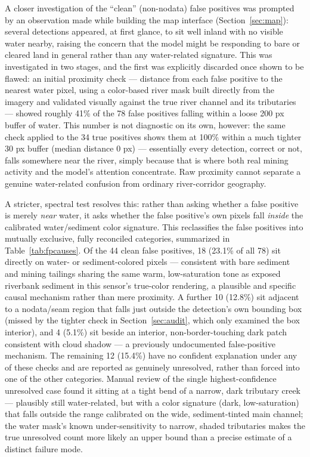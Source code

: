 \documentclass[11pt,a4paper]{article}
\begin{document}
A closer investigation of the ``clean'' (non-nodata) false positives was
prompted by an observation made while building the map interface
(Section~\ref{sec:map}): several detections appeared, at first glance, to
sit well inland with no visible water nearby, raising the concern that the
model might be responding to bare or cleared land in general rather than
any water-related signature. This was investigated in two stages, and the
first was explicitly discarded once shown to be flawed: an initial proximity
check --- distance from each false positive to the nearest water pixel,
using a color-based river mask built directly from the imagery and
validated visually against the true river channel and its tributaries ---
showed roughly 41\% of the 78 false positives falling within a loose 200 px
buffer of water. This number is not diagnostic on its own, however: the
same check applied to the 34 true positives shows them at 100\% within a
much tighter 30 px buffer (median distance 0 px) --- essentially every
detection, correct or not, falls somewhere near the river, simply because
that is where both real mining activity and the model's attention
concentrate. Raw proximity cannot separate a genuine water-related
confusion from ordinary river-corridor geography.

A stricter, spectral test resolves this: rather than asking whether a false
positive is merely \emph{near} water, it asks whether the false positive's
own pixels fall \emph{inside} the calibrated water/sediment color
signature. This reclassifies the false positives into mutually exclusive,
fully reconciled categories, summarized in
Table~\ref{tab:fpcauses}. Of the 44 clean false positives, 18 (23.1\% of
all 78) sit directly on water- or sediment-colored pixels --- consistent
with bare sediment and mining tailings sharing the same warm, low-saturation
tone as exposed riverbank sediment in this sensor's true-color rendering,
a plausible and specific causal mechanism rather than mere proximity. A
further 10 (12.8\%) sit adjacent to a nodata/seam region that falls just
outside the detection's own bounding box (missed by the tighter check in
Section~\ref{sec:audit}, which only examined the box interior), and 4
(5.1\%) sit beside an interior, non-border-touching dark patch consistent
with cloud shadow --- a previously undocumented false-positive mechanism.
The remaining 12 (15.4\%) have no confident explanation under any of these
checks and are reported as genuinely unresolved, rather than forced into
one of the other categories. Manual review of the single highest-confidence
unresolved case found it sitting at a tight bend of a narrow, dark tributary
creek --- plausibly still water-related, but with a color signature (dark,
low-saturation) that falls outside the range calibrated on the wide,
sediment-tinted main channel; the water mask's known under-sensitivity to
narrow, shaded tributaries makes the true unresolved count more likely an
upper bound than a precise estimate of a distinct failure mode.
\end{document}
